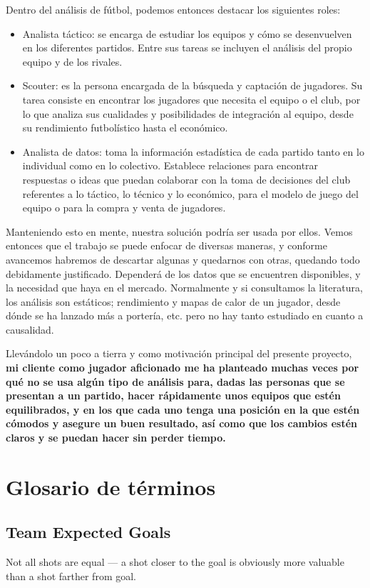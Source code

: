 Dentro del análisis de fútbol, podemos entonces destacar los siguientes roles:

\begin{itemize}
    \item Analista táctico: se encarga de estudiar los equipos y cómo se desenvuelven en los diferentes partidos. Entre sus tareas se incluyen el análisis del propio equipo y de los rivales.
    \item Scouter: es la persona encargada de la búsqueda y captación de jugadores. Su tarea consiste en encontrar los jugadores que necesita el equipo o el club, por lo que analiza sus cualidades y posibilidades de integración al equipo, desde su rendimiento futbolístico hasta el económico.
    \item Analista de datos: toma la información estadística de cada partido tanto en lo individual como en lo colectivo. Establece relaciones para encontrar respuestas o ideas que puedan colaborar con la toma de decisiones del club referentes a lo táctico, lo técnico y lo económico, para el modelo de juego del equipo o para la compra y venta de jugadores.
\end{itemize}
Manteniendo esto en mente, nuestra solución 
podría ser usada por ellos. Vemos entonces 
que el trabajo se puede enfocar de diversas 
maneras, y conforme avancemos habremos de descartar algunas y 
quedarnos con otras, quedando todo debidamente justificado. Dependerá de los 
datos que se encuentren disponibles, y la necesidad que haya en el mercado. 
Normalmente y si consultamos la literatura, los análisis son estáticos; 
rendimiento y mapas de calor de un jugador, desde dónde se ha lanzado más 
a portería, etc. pero no hay tanto estudiado en cuanto a causalidad.

Llevándolo un poco a tierra y como motivación principal del presente proyecto,
\textbf{mi cliente como jugador aficionado me ha planteado muchas veces por qué 
 no se usa algún tipo de análisis para, dadas las personas que se presentan 
 a un partido, hacer rápidamente unos equipos que estén equilibrados, y en 
 los que cada uno tenga una posición en la que estén cómodos y asegure un 
 buen resultado, así como que los cambios estén claros y se puedan hacer 
 sin perder tiempo.}


\section{Glosario de términos}
\subsection{Team Expected Goals}
Not all shots are equal — a shot closer to the goal is obviously more 
valuable than a shot farther from goal.

